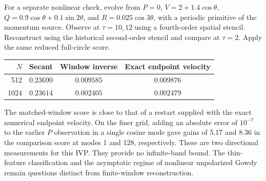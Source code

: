 For a separate nonlinear check, evolve from $P=0$,
$V=2+1.4\cos\theta$, $Q=0.9\cos\theta+0.1\sin2\theta$,
and $R=0.025\cos3\theta$, with a periodic primitive of the
momentum source. Observe at $\tau=10,12$ using a fourth-order
spatial stencil. Reconstruct using the historical second-order
stencil and compare at $\tau=2$.
Apply the same reduced full-circle score.

\begin{center}
\begin{tabular}{rccc}
\toprule
$N$ & Secant & Window inverse & Exact endpoint velocity\\
\midrule
512  & $0.23690$ & $0.009585$ & $0.009876$\\
1024 & $0.23614$ & $0.002405$ & $0.002479$\\
\bottomrule
\end{tabular}
\end{center}
The matched-window score is close to that of a restart supplied
with the exact numerical endpoint velocity. On the finer grid,
adding an absolute error of $10^{-7}$ to the earlier $P$
observation in a single cosine mode gave gains of 5.17 and 8.36
in the comparison score at modes 1 and 128, respectively.
These are two directional measurements for this IVP. They
provide no infinite-band bound. The thin-feature classification
and the asymptotic regime of nonlinear unpolarized Gowdy
remain questions distinct from finite-window reconstruction.
